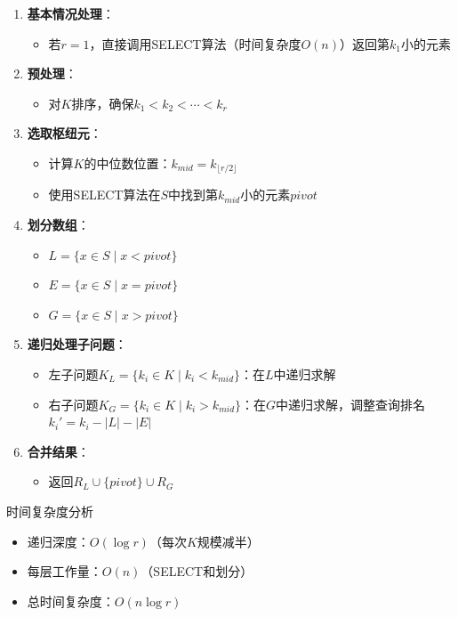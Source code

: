 \documentclass[./../main.tex]{subfiles}
\begin{document}
\begin{enumerate}
    \item \textbf{基本情况处理}：
    \begin{itemize}
        \item 若$r=1$，直接调用SELECT算法（时间复杂度$O(n)$）返回第$k_1$小的元素
    \end{itemize}

    \item \textbf{预处理}：
    \begin{itemize}
        \item 对$K$排序，确保$k_1<k_2<\cdots<k_r$
    \end{itemize}

    \item \textbf{选取枢纽元}：
    \begin{itemize}
        \item 计算$K$的中位数位置：$k_{mid}=k_{\lfloor r/2 \rfloor}$
        \item 使用SELECT算法在$S$中找到第$k_{mid}$小的元素$pivot$
    \end{itemize}

    \item \textbf{划分数组}：
    \begin{itemize}
        \item $L=\{x\in S\mid x<pivot\}$
        \item $E=\{x\in S\mid x=pivot\}$
        \item $G=\{x\in S\mid x>pivot\}$
    \end{itemize}

    \item \textbf{递归处理子问题}：
    \begin{itemize}
        \item 左子问题$K_L=\{k_i\in K\mid k_i<k_{mid}\}$：在$L$中递归求解
        \item 右子问题$K_G=\{k_i\in K\mid k_i>k_{mid}\}$：在$G$中递归求解，调整查询排名$k_i'=k_i-|L|-|E|$
    \end{itemize}

    \item \textbf{合并结果}：
    \begin{itemize}
        \item 返回$R_L\cup\{pivot\}\cup R_G$
    \end{itemize}
\end{enumerate}

时间复杂度分析
\begin{itemize}
    \item 递归深度：$O(\log r)$（每次$K$规模减半）
    \item 每层工作量：$O(n)$（SELECT和划分）
    \item 总时间复杂度：$O(n\log r)$
\end{itemize}
\end{document}
